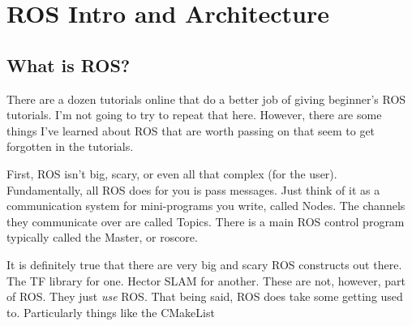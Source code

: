 
\chapter{ROS Intro and Architecture}
\label{chap:rosarchitecture}

\section{What is ROS?}

There are a dozen tutorials online that do a better job of giving beginner's ROS tutorials. I'm not going to try to repeat that here. However, there are some things I've learned about ROS that are worth passing on that seem to get forgotten in the tutorials.

First, ROS isn't big, scary, or even all that complex (for the user). Fundamentally, all ROS does for you is pass messages. Just think of it as a communication system for mini-programs you write, called Nodes. The channels they communicate over are called Topics. There is a main ROS control program typically called the Master, or roscore.

It is definitely true that there are very big and scary ROS constructs out there. The TF library for one. Hector SLAM for another. These are not, however, part of ROS. They just \textit{use} ROS. That being said, ROS does take some getting used to. Particularly things like the CMakeList